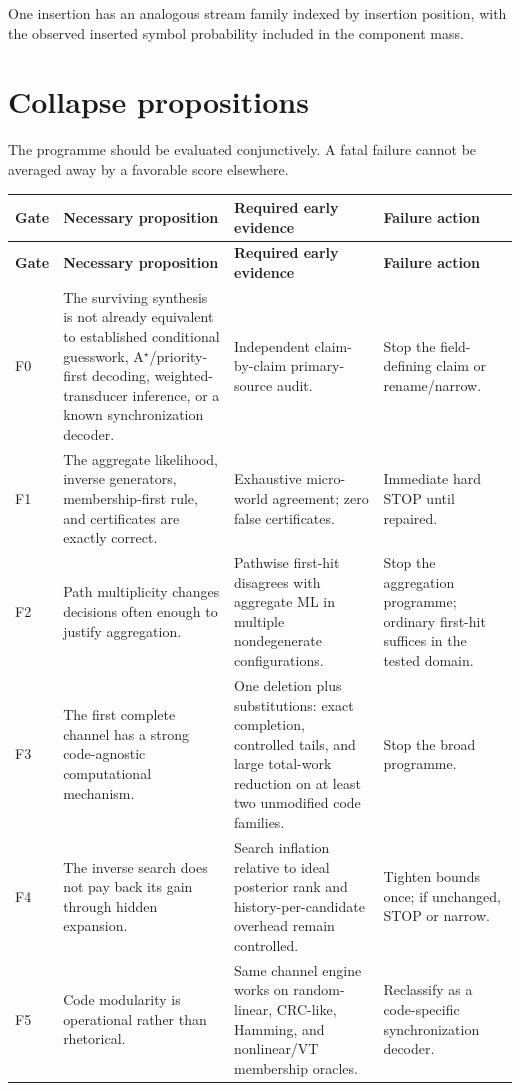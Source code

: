 \documentclass[11pt]{article}
\begin{document}
One insertion has an analogous stream family indexed by insertion position, with the observed inserted symbol probability included in the component mass.

\section{Collapse propositions}
The programme should be evaluated conjunctively. A fatal failure cannot be averaged away by a favorable score elsewhere.

\begin{longtable}{p{}p{}p{}p{}}
\toprule
\textbf{Gate} & \textbf{Necessary proposition} & \textbf{Required early evidence} & \textbf{Failure action}\\
\midrule
\endfirsthead
\toprule
\textbf{Gate} & \textbf{Necessary proposition} & \textbf{Required early evidence} & \textbf{Failure action}\\
\midrule
\endhead
F0 & The surviving synthesis is not already equivalent to established conditional guesswork, A$^\star$/priority-first decoding, weighted-transducer inference, or a known synchronization decoder. & Independent claim-by-claim primary-source audit. & Stop the field-defining claim or rename/narrow.\\
F1 & The aggregate likelihood, inverse generators, membership-first rule, and certificates are exactly correct. & Exhaustive micro-world agreement; zero false certificates. & Immediate hard STOP until repaired.\\
F2 & Path multiplicity changes decisions often enough to justify aggregation. & Pathwise first-hit disagrees with aggregate ML in multiple nondegenerate configurations. & Stop the aggregation programme; ordinary first-hit suffices in the tested domain.\\
F3 & The first complete channel has a strong code-agnostic computational mechanism. & One deletion plus substitutions: exact completion, controlled tails, and large total-work reduction on at least two unmodified code families. & Stop the broad programme.\\
F4 & The inverse search does not pay back its gain through hidden expansion. & Search inflation relative to ideal posterior rank and history-per-candidate overhead remain controlled. & Tighten bounds once; if unchanged, STOP or narrow.\\
F5 & Code modularity is operational rather than rhetorical. & Same channel engine works on random-linear, CRC-like, Hamming, and nonlinear/VT membership oracles. & Reclassify as a code-specific synchronization decoder.\\

\end{longtable}
\end{document}
